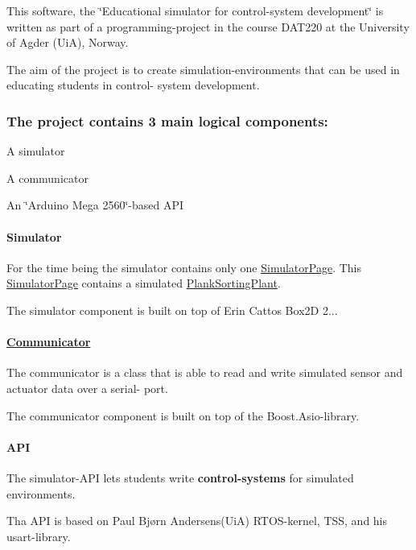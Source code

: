 This software, the \char`\"{}\-Educational simulator for control-\/system development\char`\"{} is written as part of a programming-\/project in the course D\-A\-T220 at the University of Agder (Ui\-A), Norway.

The aim of the project is to create simulation-\/environments that can be used in educating students in control-\/ system development.

\subsubsection*{The project contains 3 main logical components\-:}


\begin{DoxyItemize}
\item A simulator
\item A communicator
\item An \char`\"{}\-Arduino Mega 2560\char`\"{}-\/based A\-P\-I
\end{DoxyItemize}

\paragraph*{Simulator}

For the time being the simulator contains only one \hyperlink{classSimulatorPage}{Simulator\-Page}. This \hyperlink{classSimulatorPage}{Simulator\-Page} contains a simulated \hyperlink{classPlankSortingPlant}{Plank\-Sorting\-Plant}.

The simulator component is built on top of Erin Cattos Box2\-D 2...

\paragraph*{\hyperlink{classCommunicator}{Communicator}}

The communicator is a class that is able to read and write simulated sensor and actuator data over a serial-\/ port.

The communicator component is built on top of the Boost.\-Asio-\/library.

\paragraph*{A\-P\-I}

The simulator-\/\-A\-P\-I lets students write {\bfseries control-\/systems} for simulated environments.

Tha A\-P\-I is based on Paul Bjørn Andersens(\-Ui\-A) R\-T\-O\-S-\/kernel, T\-S\-S, and his usart-\/library.

